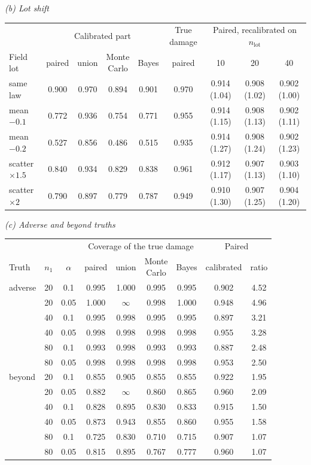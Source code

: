 \begin{table}[htbp]
\medskip
\textit{(b) Lot shift}\\[2pt]
\begin{tabular*}{\textwidth}{@{\extracolsep{\fill}}lcccccccc@{}}
\toprule
& \multicolumn{4}{c}{Calibrated part} & True damage & \multicolumn{3}{c}{Paired, recalibrated on $n_{\mathrm{lot}}$} \\
\cmidrule(lr){2-5}\cmidrule(lr){6-6}\cmidrule(l){7-9}
Field lot & paired & union & \makecell{Monte\\Carlo} & Bayes & paired & 10 & 20 & 40 \\
\midrule
same law & 0.900 & 0.970 & 0.894 & 0.901 & 0.970 & 0.914 (1.04) & 0.908 (1.02) & 0.902 (1.00) \\
mean $-0.1$ & 0.772 & 0.936 & 0.754 & 0.771 & 0.955 & 0.914 (1.15) & 0.908 (1.13) & 0.902 (1.11) \\
mean $-0.2$ & 0.527 & 0.856 & 0.486 & 0.515 & 0.935 & 0.914 (1.27) & 0.908 (1.24) & 0.902 (1.23) \\
scatter $\times1.5$ & 0.840 & 0.934 & 0.829 & 0.838 & 0.961 & 0.912 (1.17) & 0.907 (1.13) & 0.903 (1.10) \\
scatter $\times2$ & 0.790 & 0.897 & 0.779 & 0.787 & 0.949 & 0.910 (1.30) & 0.907 (1.25) & 0.904 (1.20) \\
\bottomrule
\end{tabular*}

\medskip
\textit{(c) Adverse and beyond truths}\\[2pt]
\begin{tabular*}{\textwidth}{@{\extracolsep{\fill}}lcccccccc@{}}
\toprule
& & & \multicolumn{4}{c}{Coverage of the true damage} & \multicolumn{2}{c}{Paired} \\
\cmidrule(lr){4-7}\cmidrule(l){8-9}
Truth & $n_1$ & $\alpha$ & paired & union & \makecell{Monte\\Carlo} & Bayes & calibrated & ratio \\
\midrule
adverse & 20 & 0.1 & 0.995 & 1.000 & 0.995 & 0.995 & 0.902 & 4.52 \\
 & 20 & 0.05 & 1.000 & $\infty$ & 0.998 & 1.000 & 0.948 & 4.96 \\
 & 40 & 0.1 & 0.995 & 0.998 & 0.995 & 0.995 & 0.897 & 3.21 \\
 & 40 & 0.05 & 0.998 & 0.998 & 0.998 & 0.998 & 0.955 & 3.28 \\
 & 80 & 0.1 & 0.993 & 0.998 & 0.993 & 0.993 & 0.887 & 2.48 \\
 & 80 & 0.05 & 0.998 & 0.998 & 0.998 & 0.998 & 0.953 & 2.50 \\
\addlinespace
beyond & 20 & 0.1 & 0.855 & 0.905 & 0.855 & 0.855 & 0.922 & 1.95 \\
 & 20 & 0.05 & 0.882 & $\infty$ & 0.860 & 0.865 & 0.960 & 2.09 \\
 & 40 & 0.1 & 0.828 & 0.895 & 0.830 & 0.833 & 0.915 & 1.50 \\
 & 40 & 0.05 & 0.873 & 0.943 & 0.855 & 0.860 & 0.955 & 1.58 \\
 & 80 & 0.1 & 0.725 & 0.830 & 0.710 & 0.715 & 0.907 & 1.07 \\
 & 80 & 0.05 & 0.815 & 0.895 & 0.767 & 0.777 & 0.960 & 1.07 \\
\bottomrule
\end{tabular*}


\end{table}
